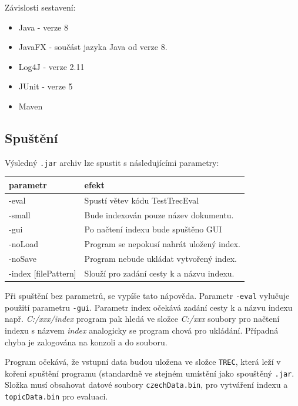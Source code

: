 \documentclass[12pt, a4paper]{article}
\begin{document}
Závislosti sestavení:
\begin{itemize}
\item Java - verze 8

\item JavaFX - součást jazyka Java od verze 8.
\item Log4J - verze 2.11

\item JUnit - verze 5  \footnotemark[1]

\item Maven \footnotemark[1]


\end{itemize}

\subsection{Spuštění}

Výsledný \texttt{.jar} archiv lze spustit s následujícími parametry:

\begin{table}[ht!]
\centering
\begin{tabular}{l | l}
parametr & efekt\\
\hline
-eval   & Spustí větev kódu TestTrecEval\\
-small  & Bude indexován pouze název dokumentu.\\
-gui    & Po načtení indexu bude spuštěno GUI\\
-noLoad & Program se nepokusí nahrát uložený index.\\
-noSave & Program nebude ukládat vytvořený index.\\
-index [filePattern] & Slouží pro zadání cesty k a názvu indexu.\\
\end{tabular}
\end{table}

Při spuštění bez parametrů, se vypíše tato nápověda. Parametr \texttt{-eval} vylučuje použití parametru \texttt{-gui}. Parametr index očekává zadání cesty k a názvu indexu např. \emph{C:/xxx/index} program pak hledá ve složce \emph{C:/xxx} soubory pro načtení indexu s názvem \emph{index} analogicky se program chová pro ukládání. Případná chyba je zalogována na konzoli a do souboru.

Program očekává, že vstupní data budou uložena ve složce \texttt{TREC}, která leží v kořeni spuštění programu (standardně ve stejném umístění jako spouštěný \texttt{.jar}. Složka musí obsahovat datové soubory \texttt{czechData.bin}, pro vytváření indexu a \texttt{topicData.bin} pro evaluaci.
\end{document}
